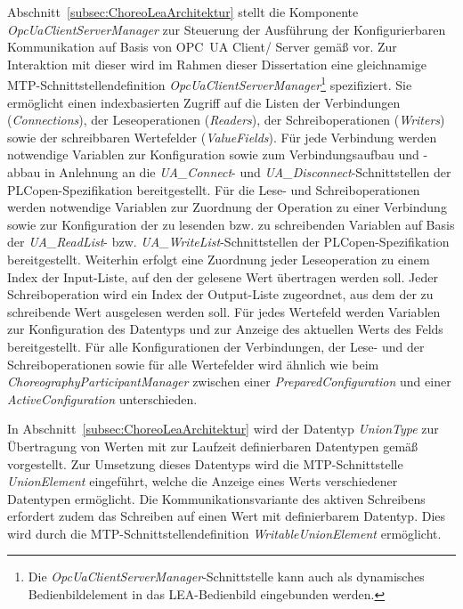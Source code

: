 Abschnitt~\ref{subsec:ChoreoLeaArchitektur} stellt die Komponente \emph{OpcUaClientServerManager} zur Steuerung der Ausführung der Konfigurierbaren Kommunikation auf Basis von OPC~UA Client/ Server gemäß \cite{Stutz.2026} vor. Zur Interaktion mit dieser wird im Rahmen dieser Dissertation eine gleichnamige MTP-Schnittstellendefinition \emph{OpcUaClientServerManager}\footnote{Die \emph{OpcUaClientServerManager}-Schnittstelle kann auch als dynamisches Bedienbildelement in das LEA-Bedienbild eingebunden werden.} spezifiziert. Sie ermöglicht einen indexbasierten Zugriff auf die Listen der Verbindungen (\emph{Connections}), der Leseoperationen (\emph{Readers}), der Schreiboperationen (\emph{Writers}) sowie der schreibbaren Wertefelder (\emph{ValueFields}). Für jede Verbindung werden notwendige Variablen zur Konfiguration sowie zum Verbindungsaufbau und -abbau in Anlehnung an die \emph{UA\_Connect}- und \emph{UA\_Disconnect}-Schnittstellen der PLCopen-Spezifikation \cite{OPCFoundation.30001} bereitgestellt. Für die Lese- und Schreiboperationen werden notwendige Variablen zur Zuordnung der Operation zu einer Verbindung sowie zur Konfiguration der zu lesenden bzw. zu schreibenden Variablen auf Basis der \emph{UA\_ReadList}- bzw. \emph{UA\_WriteList}-Schnittstellen der PLCopen-Spezifikation \cite{OPCFoundation.30001} bereitgestellt. Weiterhin erfolgt eine Zuordnung jeder Leseoperation zu einem Index der Input-Liste, auf den der gelesene Wert übertragen werden soll. Jeder Schreiboperation wird ein Index der Output-Liste zugeordnet, aus dem der zu schreibende Wert ausgelesen werden soll. Für jedes Wertefeld werden Variablen zur Konfiguration des Datentyps und zur Anzeige des aktuellen Werts des Felds bereitgestellt. Für alle Konfigurationen der Verbindungen, der Lese- und der Schreiboperationen sowie für alle Wertefelder wird ähnlich wie beim \emph{ChoreographyParticipantManager} zwischen einer \emph{PreparedConfiguration} und einer \emph{ActiveConfiguration} unterschieden. 

In Abschnitt~\ref{subsec:ChoreoLeaArchitektur} wird der Datentyp \emph{UnionType} zur Übertragung von Werten mit zur Laufzeit definierbaren Datentypen gemäß \cite{Stutz.2026} vorgestellt. Zur Umsetzung dieses Datentyps wird die MTP-Schnittstelle \emph{UnionElement} eingeführt, welche die Anzeige eines Werts verschiedener Datentypen ermöglicht. Die Kommunikationsvariante des aktiven Schreibens erfordert zudem das Schreiben auf einen Wert mit definierbarem Datentyp. Dies wird durch die MTP-Schnittstellendefinition \emph{WritableUnionElement} ermöglicht. 

